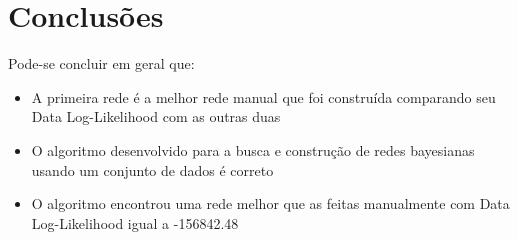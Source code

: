 \section{Conclusões}
	Pode-se concluir em geral que:\\
	\begin{itemize}
		\item A primeira rede é a melhor rede manual que foi construída comparando seu Data Log-Likelihood com as outras duas
		\item O algoritmo desenvolvido para a busca e construção de redes bayesianas usando um conjunto de dados é correto
		\item O algoritmo encontrou uma rede melhor que as feitas manualmente com Data Log-Likelihood igual a -156842.48
	\end{itemize}

\clearpage